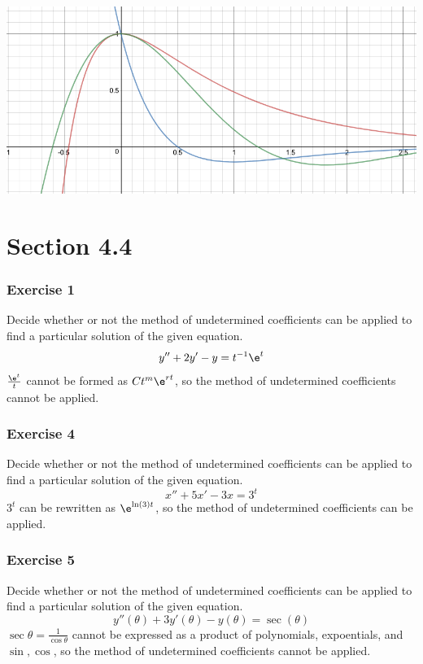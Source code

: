 \documentclass{math}
\begin{document}
\begin{center}
  \includegraphics[width=16cm]{assets/hw_06_01.png}
\end{center}

\section*{Section 4.4}

\subsubsection*{Exercise 1}
Decide whether or not the method of undetermined coefficients can be applied to
find a particular solution of the given equation.
\[ y''+2y'-y = t^{-1}\e^t \]
\( \frac{\e^t}{t} \) cannot be formed as \( Ct^m\e^{rt} \), so the method of
undetermined coefficients cannot be applied.

\subsubsection*{Exercise 4}
Decide whether or not the method of undetermined coefficients can be applied to
find a particular solution of the given equation.
\[ x''+5x'-3x = 3^t \]
\( 3^t \) can be rewritten as \( \e^{\ln(3)t} \), so the method of undetermined
coefficients can be applied.

\subsubsection*{Exercise 5}
Decide whether or not the method of undetermined coefficients can be applied to
find a particular solution of the given equation.
\[ y''(\theta)+3y'(\theta)-y(\theta) = \sec(\theta) \]
\( \sec\theta = \frac{1}{\cos\theta} \) cannot be expressed as a product of
polynomials, expoentials, and \( \sin,\cos \), so the method of undetermined
coefficients cannot be applied.
\end{document}
